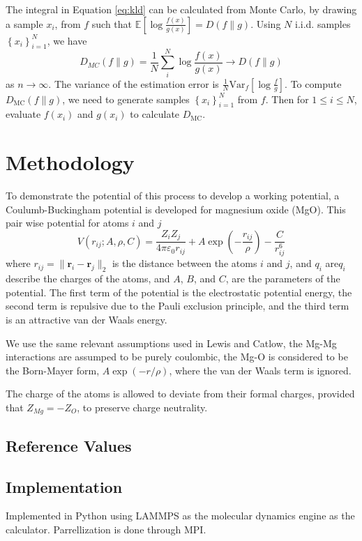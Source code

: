 The integral in Equation \ref{eq:kld} can be calculated from Monte Carlo\cite{hershey2007kld}, by drawing a sample $x_i$, from $f$ such that $\mathbb{E}\left[\log\frac{f(x)}{g(x)}\right] = D(f \parallel g)$.  Using $N$ i.i.d. samples $\left\{x_i\right\}_{i=1}^N$, we have
\begin{equation}
  \label{eq:kdmc}
  D_{MC}(f \parallel g) = \frac{1}{N}\sum_i^N \log \frac{f(x)}{g(x)}
      \rightarrow D(f \parallel g)
\end{equation}
as $n \rightarrow \infty$.  The variance of the estimation error is $\frac{1}{N}\mathrm{Var}_f\left[\log\frac{f}{g}\right]$.  To compute $D_{\mathrm{MC}}(f \parallel g)$, we need to generate samples $\left\{x_i\right\}_{i=1}^N$ from $f$.  Then for $1 \leq i \leq N$, evaluate $f(x_i)$ and $g(x_i)$ to calculate $D_{\mathrm{MC}}$.

\section{Methodology}
To demonstrate the potential of this process to develop a working potential, a Coulumb-Buckingham potential\cite{buckingham1938} is developed for magnesium oxide (MgO).  This pair wise potential for atoms $i$ and $j$
\begin{equation}
    \label{eq:buck_eq}
    V(r_{ij};A,\rho,C)
        = \frac{Z_i Z_j}{4 \pi \varepsilon_0 r_{ij}}
            + A \exp(-\frac{r_{ij}}{\rho})
            - \frac{C}{r_{ij}^6}
\end{equation}
where $r_{ij} = \lVert \bm{r}_i - \bm{r}_j \rVert_2$ is the distance between the atoms $i$ and $j$, and $q_i$ are$q_i$ describe the charges of the atoms, and $A$, $B$, and $C$, are the parameters of the potential.  The first term of the potential is the electrostatic potential energy, the second term is repulsive due to the Pauli exclusion principle, and the third term is an attractive van der Waals energy.

We use the same relevant assumptions used in Lewis and Catlow\cite{lewis1985potential}, the Mg-Mg interactions are assumped to be purely coulombic, the Mg-O is considered to be the Born-Mayer form, $A \exp(-r/\rho)$, where the van der Waals term is ignored.

The charge of the atoms is allowed to deviate from their formal charges, provided that $Z_{Mg} = - Z_{O}$, to preserve charge neutrality.
\subsection{Reference Values}

\subsection{Implementation}
Implemented in Python using LAMMPS as the molecular dynamics engine as the calculator.  Parrellization is done through MPI.

